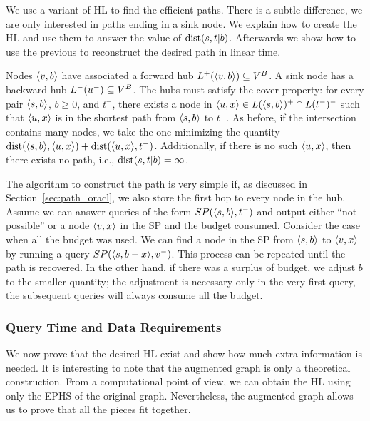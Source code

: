 We use a variant of HL to find the efficient paths.
There is a subtle difference, we are only interested in paths ending in a sink node.
We explain how to create the HL and use them to answer the value of $\text{dist}(s,t|b)$.
Afterwards we show how to use the previous to reconstruct the desired path in linear time.

Nodes $\langle v,b\rangle$ have associated a forward hub $L^+(\langle v,b\rangle)\subseteq V^B$.
A sink node has a backward hub $L^-(u^-)\subseteq V^B$.
The hubs must satisfy the cover property: for every pair $\langle s,b\rangle$, $b\geq 0$, and $t^-$, there exists a node in $\langle u,x\rangle\in L(\langle s,b\rangle)^+\cap L(t^-)^-$ such that $\langle u,x\rangle$ is in the shortest path from $\langle s,b\rangle$ to $t^-$.
As before, if the intersection contains many nodes, we take the one minimizing the quantity $\text{dist}(\langle s,b\rangle,\langle u,x\rangle)+\text{dist}(\langle u,x\rangle,t^-)$.
Additionally, if there is no such $\langle u,x\rangle$, then there exists no path, i.e., $\text{dist}(s,t|b)=\infty$.

The algorithm to construct the path is very simple if, as discussed in Section~\ref{sec:path_oracl}, we also store the first hop to every node in the hub.
Assume we can answer queries of the form $SP(\langle s,b\rangle,t^-)$ and output either ``not possible'' or a node $\langle v,x\rangle$ in the SP and the budget consumed.
Consider the case when all the budget was used.
We can find a node in the SP from $\langle s,b\rangle$ to $\langle v,x\rangle$ by running a query $SP(\langle s,b-x\rangle,v^-)$.
This process can be repeated until the path is recovered.
In the other hand, if there was a surplus of budget, we adjust $b$ to the smaller quantity; the adjustment is necessary only in the very first query, the subsequent queries will always consume all the budget.

\subsubsection{Query Time and Data Requirements}
We now prove that the desired HL exist and show how much extra information is needed.
It is interesting to note that the augmented graph is only a theoretical construction.
From a computational point of view, we can obtain the HL using only the EPHS of the original graph.
Nevertheless, the augmented graph allows us to prove that all the pieces fit together.

